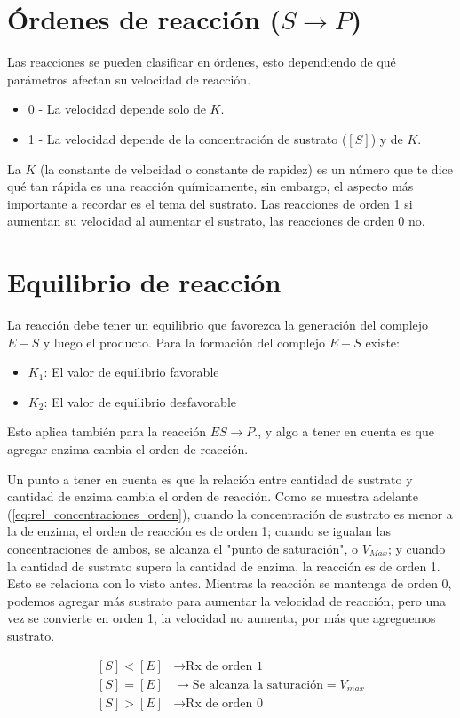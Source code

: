 \section{Órdenes de reacción ($S \longrightarrow P$)}

Las reacciones se pueden clasificar en órdenes, esto dependiendo de qué parámetros afectan su velocidad de reacción.

\begin{itemize}
    \item 0 - La velocidad depende solo de $K$.
    \item 1 - La velocidad depende de la concentración de sustrato ($[S]$) y de $K$.
\end{itemize}

La $K$ (la constante de velocidad o constante de rapidez) es un número que te dice qué tan rápida es una reacción químicamente, sin embargo, el aspecto más importante a recordar es el tema del sustrato. Las reacciones de orden 1 si aumentan su velocidad al aumentar el sustrato, las reacciones de orden 0 no.

\section{Equilibrio de reacción}

La reacción debe tener un equilibrio que favorezca la generación del complejo $E-S$ y luego el producto.
Para la formación del complejo $E-S$ existe:

\begin{itemize}
    \item $K_{1}$: El valor de equilibrio favorable
    \item $K_{2}$: El valor de equilibrio desfavorable
\end{itemize}

Esto aplica también para la reacción $ES \longrightarrow P$., y algo a tener en cuenta es que agregar enzima cambia el orden de reacción.

Un punto a tener en cuenta es que la relación entre cantidad de sustrato y cantidad de enzima cambia el orden de reacción. Como se muestra adelante (\autoref{eq:rel_concentraciones_orden}), cuando la concentración de sustrato es menor a la de enzima, el orden de reacción es de orden 1; cuando se igualan las concentraciones de ambos, se alcanza el "punto de saturación", o $V_{Max}$; y cuando la cantidad de sustrato supera la cantidad de enzima, la reacción es de orden 1.
Esto se relaciona con lo visto antes. Mientras la reacción se mantenga de orden 0, podemos agregar más sustrato para aumentar la velocidad de reacción, pero una vez se convierte en orden 1, la velocidad no aumenta, por más que agreguemos sustrato.

\begin{align*}\label{eq:rel_concentraciones_orden}
    [S] < [E] &\longrightarrow \text{Rx de orden 1}
    \\
    [S] = [E] &\longrightarrow \text{Se alcanza la saturación} = V_{max}
    \\
    [S] > [E] &\longrightarrow \text{Rx de orden 0}
\end{align*}